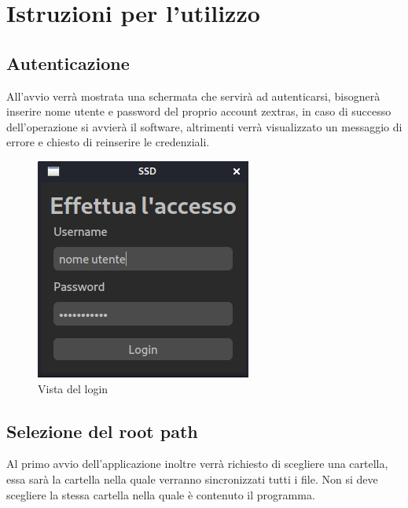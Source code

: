 \section{Istruzioni per l'utilizzo}
\subsection{Autenticazione}

All'avvio verrà mostrata una schermata che servirà ad autenticarsi, bisognerà inserire nome utente e password del proprio account zextras, in caso di successo dell'operazione si avvierà il software, altrimenti verrà visualizzato un messaggio di errore e chiesto di reinserire le credenziali.

\begin{figure}[H]
    \centering
    \includegraphics[scale = 0.50]{components/img/login.png}
    \caption{Vista del login}
    \label{fig:Vista del login}
\end{figure}

\subsection{Selezione del root path}

Al primo avvio dell'applicazione inoltre verrà richiesto di scegliere una cartella, essa sarà la cartella nella quale verranno sincronizzati tutti i file. Non si deve scegliere la stessa cartella nella quale è contenuto il programma.

